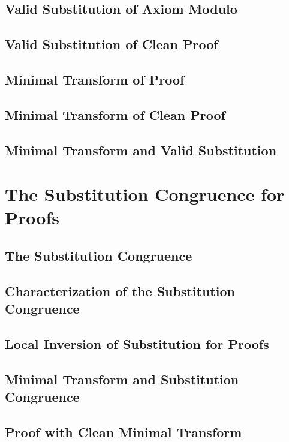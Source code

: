     \subsection{Valid Substitution of Axiom Modulo}
      
    \subsection{Valid Substitution of Clean Proof}
      
    \subsection{Minimal Transform of Proof}
      
    \subsection{Minimal Transform of Clean Proof}
      
    \subsection{Minimal Transform and Valid Substitution}
      
\section{The Substitution Congruence for Proofs}
    \subsection{The Substitution Congruence}
      
    \subsection{Characterization of the Substitution Congruence}
      
    \subsection{Local Inversion of Substitution for Proofs}
      
    \subsection{Minimal Transform and Substitution Congruence}
      
    \subsection{Proof with Clean Minimal Transform}
      
